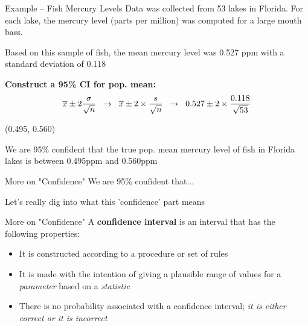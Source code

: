 \documentclass{beamer}
\begin{document}
\begin{frame}{Example -- Fish Mercury Levels}
Data was collected from 53 lakes in Florida. For each lake, the mercury level (parts per million) was computed for a large mouth bass. \vspace{2mm}

Based on this sample of fish, the mean mercury level was 0.527 ppm with a standard deviation of 0.118 \vspace{2mm}

\textbf{Construct a 95\% CI for pop. mean:}
\begin{align*}
\overline{x} \pm 2\frac{\sigma}{\sqrt{n}} \hspace{2mm}\rightarrow \hspace{2mm} \overline{x} \pm 2\times \frac{s}{\sqrt{n}} \hspace{2mm}\rightarrow \hspace{2mm} 0.527 \pm 2\times \frac{0.118}{\sqrt{53}}
\end{align*}
\begin{center}
    (0.495, 0.560)
\end{center} \vspace{3mm}

We are 95\% confident that the true pop. mean mercury level of fish in Florida lakes is between 0.495ppm and 0.560ppm
\end{frame}

\begin{frame}{More on "Confidence"}
We are 95\% confident that... \vspace{8mm}

Let's really dig into what this 'confidence' part means
\end{frame}

\begin{frame}{More on "Confidence"}
A \textbf{confidence interval} is an interval that has the following properties:
\begin{itemize}
\item It is constructed according to a procedure or set of rules
\item It is made with the intention of giving a plausible range of values for a \textit{parameter} based on a \textit{statistic}
\item There is no probability associated with a confidence interval; \textit{it is either correct or it is incorrect}
\end{itemize}
\vspace{4mm}
\end{frame}
\end{document}
